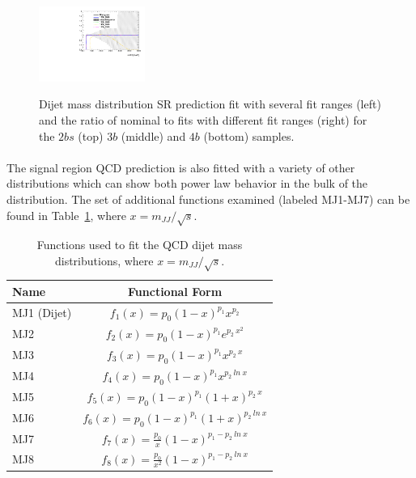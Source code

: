 \begin{figure}[htbp!]
\begin{center}
\includegraphics[width=0.31\textwidth,angle=-90]{figures/boosted/Syst_Smooth/smoothFuncRangeCompare_44_comp_ratio.pdf} \\
\caption{Dijet mass distribution SR prediction fit with several fit ranges (left) and the ratio of nominal to fits with different fit ranges (right)  for the $2bs$ (top) $3b$ (middle) and $4b$ (bottom) samples. }
\label{fig:qcd_fit_range_sys_ratio-scaled}
\end{center}
\end{figure}

\paragraph{}
The signal region QCD prediction is also fitted with a variety of other distributions which can show both power law behavior in the bulk of the distribution. 
The set of additional functions examined (labeled MJ1-MJ7) can be found in Table~\ref{tab:fit_funcs}, where $x = m_{JJ} / \sqrt{s}$.

\begin{table}[htbp!]
\begin{center} 
\begin{tabular}{  l | c}
Name & Functional Form \\
\hline
MJ1 (Dijet) & $f_{1}(x) = p_0 (1-x)^{p_1} x^{p_2}$ \\
MJ2 & $f_{2}(x) = p_0 (1-x)^{p_1} e^{p_2\ x^2}$ \\
MJ3 & $f_{3}(x) = p_0 (1-x)^{p_1} x^{p_2\ x}$ \\
MJ4 & $f_{4}(x) = p_0 (1-x)^{p_1} x^{p_2\ ln\ x}$ \\
MJ5 & $f_{5}(x) = p_0 (1-x)^{p_1} (1+x)^{p_2\ x}$ \\
MJ6 & $f_{6}(x) = p_0 (1-x)^{p_1} (1+x)^{p_2\ ln\ x}$ \\
MJ7 & $f_{7}(x) = \frac{p_0}{x} (1-x)^{p_1 - p_2\ ln\ x}$ \\
MJ8 & $f_{8}(x) = \frac{p_0}{x^2} (1-x)^{p_1 - p_2\ ln\ x}$ \\
\hline
\end{tabular}
\caption{Functions used to fit the QCD dijet mass distributions, where $x = m_{JJ} / \sqrt{s}$.}
\label{tab:fit_funcs}
\end{center}
\end{table}

